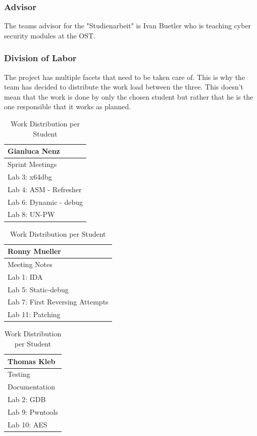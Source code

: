 \subsubsection*{Advisor}
The teams advisor for the "Studienarbeit" is Ivan Buetler who is teaching cyber security modules at the OST.

\subsubsection*{Division of Labor}
The project has multiple facets that need to be taken care of. This is why the team has decided to distribute the work load between the three. This doesn't mean that the work is done by only the chosen student but rather that he is the one responsible that it works as planned.
\begin{table}[H]
    \begin{tabular}[t]{||p{4cm}||}
        \hline
        Gianluca Nenz \\
        \hline\hline
        Sprint Meetings \\ 
        \hline
        Lab 3: x64dbg \\
        \hline
        Lab 4: ASM - Refresher \\ 
        \hline
        Lab 6: Dynamic - debug\\
        \hline
        Lab 8: UN-PW\\[1ex] 
        \hline
    \end{tabular}
    \hfill
    \begin{tabular}[t]{||p{4cm}||}
        \hline
        Ronny Mueller \\
        \hline\hline
        Meeting Notes \\
        \hline
        Lab 1: IDA \\ 
        \hline
        Lab 5: Static-debug \\
        \hline
        Lab 7: First Reversing Attempts \\ 
        \hline
        Lab 11: Patching\\[1ex] 
        \hline
    \end{tabular}
    \hfill
    \begin{tabular}[t]{||p{4cm}||}
        \hline
        Thomas Kleb \\
        \hline\hline
        Testing \\ 
        \hline
        Documentation \\
        \hline
        Lab 2: GDB \\ 
        \hline
        Lab 9: Pwntools\\
        \hline
        Lab 10: AES\\[1ex] 
        \hline
    \end{tabular}
    \caption{Work Distribution per Student}
    \label{work_dis}
\end{table}

